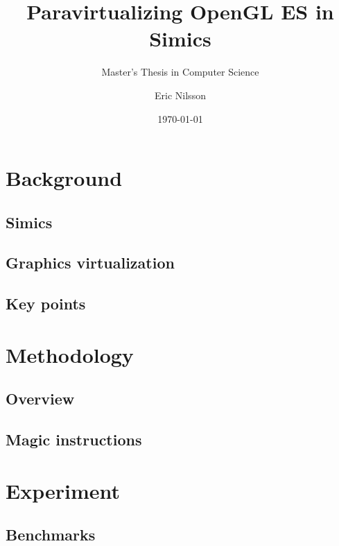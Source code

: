 \documentclass{beamer}
\title{Paravirtualizing OpenGL ES in Simics}
\subtitle{Master's Thesis in Computer Science}
\author{Eric Nilsson}
\institute{Blekinge Institute of Technology}
\date{\today} %
\begin{document}
	
	
	\section{Background}
	\subsection{Simics}
	
	\subsection{Graphics virtualization}
	

	\subsection{Key points}
	

	\section{Methodology}
	\subsection{Overview}
	
	\subsection{Magic instructions}

	\section{Experiment}
	\subsection{Benchmarks}
	
\end{document}
